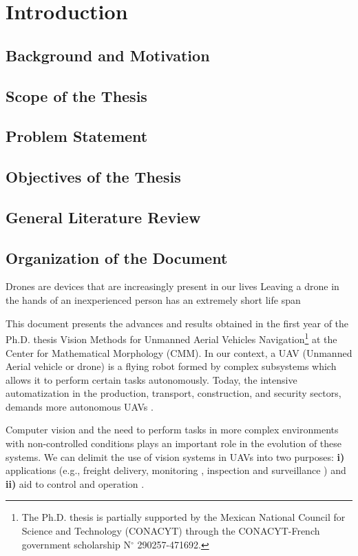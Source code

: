 \chapter{Introduction}
\section{Background and Motivation}
\section{Scope of the Thesis}
\section{Problem Statement}
\section{Objectives of the Thesis}
\section{General Literature Review}
\section{Organization of the Document}

Drones are devices that are increasingly present in our lives
Leaving a drone in the hands of an inexperienced person has an extremely short life span

This document presents the advances and results obtained in the first year of the Ph.D. thesis Vision Methods for Unmanned Aerial Vehicles Navigation\footnote{The Ph.D. thesis is partially supported by the Mexican National Council for Science and Technology (CONACYT) through the CONACYT-French government scholarship N$^{\circ}$ 290257-471692.} at the Center for Mathematical Morphology (CMM). In our context, a UAV (Unmanned Aerial vehicle or drone) is a flying robot formed by complex subsystems which allows it to perform certain tasks autonomously. Today, the intensive automatization in the production, transport, construction, and security sectors, demands more autonomous UAVs \cite{ASTechWeb}. 

Computer vision and the need to perform tasks in more complex environments with non-controlled conditions plays an important role in the evolution of these systems. We can delimit the use of vision systems in UAVs into two purposes: \textbf{i)} applications (e.g., freight delivery, monitoring \cite{Gaszczak.Breckon.ea:IRCV:2011}, inspection \cite{Rodriguez.Castiblanco.ea:ICUAS:2014} and surveillance \cite{Saif.Prabuwono.ea:IROS:2013}) and \textbf{ii)} aid to control and operation  \cite{Granlund.Nordberg.ea:ITCE:2000}. 


